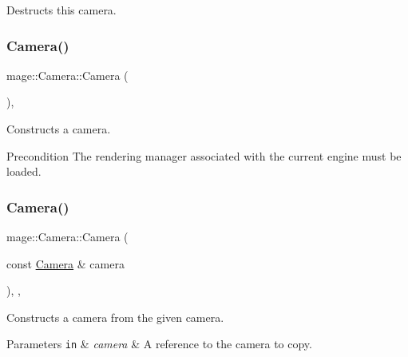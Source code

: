 Destructs this camera. \hypertarget{classmage_1_1_camera_a812001953d821fd23bb9509e5a649508}{}\label{classmage_1_1_camera_a812001953d821fd23bb9509e5a649508} 
\subsubsection{\texorpdfstring{Camera()}{Camera()}\hspace{0.1cm}{\footnotesize\ttfamily [1/3]}}
{\footnotesize\ttfamily mage\+::\+Camera\+::\+Camera (\begin{DoxyParamCaption}{ }\end{DoxyParamCaption})\hspace{0.3cm}{\ttfamily [protected]}, {\ttfamily [noexcept]}}

Constructs a camera.

\begin{DoxyPrecond}{Precondition}
The rendering manager associated with the current engine must be loaded. 
\end{DoxyPrecond}
\hypertarget{classmage_1_1_camera_a13f576c2ea50712145e43501bf3cae9c}{}\label{classmage_1_1_camera_a13f576c2ea50712145e43501bf3cae9c} 
\subsubsection{\texorpdfstring{Camera()}{Camera()}\hspace{0.1cm}{\footnotesize\ttfamily [2/3]}}
{\footnotesize\ttfamily mage\+::\+Camera\+::\+Camera (\begin{DoxyParamCaption}\item[{const \hyperlink{classmage_1_1_camera}{Camera} \&}]{camera }\end{DoxyParamCaption})\hspace{0.3cm}{\ttfamily [protected]}, {\ttfamily [default]}, {\ttfamily [noexcept]}}

Constructs a camera from the given camera.


\begin{DoxyParams}[1]{Parameters}
\mbox{\tt in}  & {\em camera} & A reference to the camera to copy. \\
\hline
\end{DoxyParams}
\hypertarget{classmage_1_1_camera_a858d43c7b166ef580c7d971719045371}{}\label{classmage_1_1_camera_a858d43c7b166ef580c7d971719045371} 
